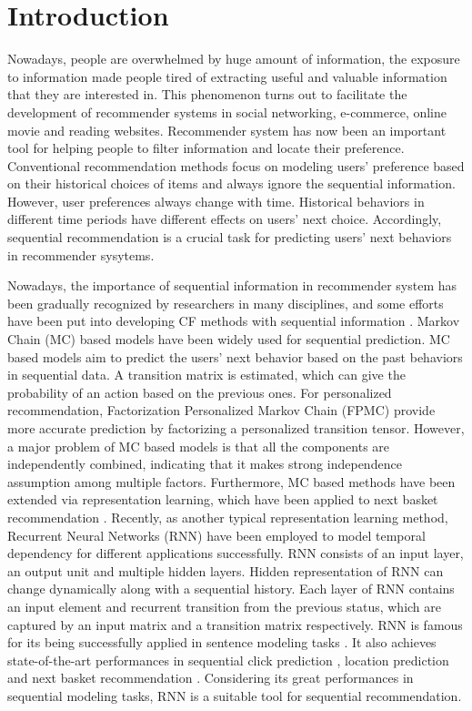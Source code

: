 \documentclass{sig-alternate}
\begin{document}
\section{Introduction}
Nowadays, people are overwhelmed by huge amount of information, the exposure to information made people tired of extracting useful and valuable information that they are interested in. This phenomenon turns out to facilitate the development of recommender systems in social networking, e-commerce, online movie and reading websites. Recommender system has now been an important tool for helping people to filter information and locate their preference. Conventional recommendation methods focus on modeling users' preference based on their historical choices of items and always ignore the sequential information. However, user preferences always change with time. Historical behaviors in different time periods have different effects on users' next choice. Accordingly, sequential recommendation is a crucial task for predicting users' next behaviors in recommender sysytems.

Nowadays, the importance of sequential information in recommender system has been gradually recognized by researchers in many disciplines, and some efforts have been put into developing CF methods with sequential information \cite{campos2014time}. Markov Chain (MC) based models \cite{yang2010personalizing,rendle2010factorizing,natarajan2013app,chen2015personalized} have been widely used for sequential prediction. MC based models aim to predict the users' next behavior based on the past behaviors in sequential data. A transition matrix is estimated, which can give the probability of an action based on the previous ones. For personalized recommendation, Factorization Personalized Markov Chain (FPMC) \cite{rendle2010factorizing} provide more accurate prediction by factorizing a personalized transition tensor. However, a major problem of MC based models is that all the components are independently combined, indicating that it makes strong independence assumption among multiple factors. Furthermore, MC based methods have been extended via representation learning, which have been applied to next basket recommendation \cite{wang2015learning}. Recently, as another typical representation learning method, Recurrent Neural Networks (RNN) have been employed to model temporal dependency for different applications successfully. RNN consists of an input layer, an output unit and multiple hidden layers. Hidden representation of RNN can change dynamically along with a sequential history. Each layer of RNN contains an input element and recurrent transition from the previous status, which are captured by an input matrix and a transition matrix respectively. RNN is famous for its being successfully applied in sentence modeling tasks \cite{mikolov2010recurrent,mikolov2011extensions,mikolov2011rnnlm}. It also achieves state-of-the-art performances in sequential click prediction \cite{zhang2014sequential}, location prediction \cite{liu2016strnn} and next basket recommendation \cite{yu2016dream}. Considering its great performances in sequential modeling tasks, RNN is a suitable tool for sequential recommendation.
\end{document}
